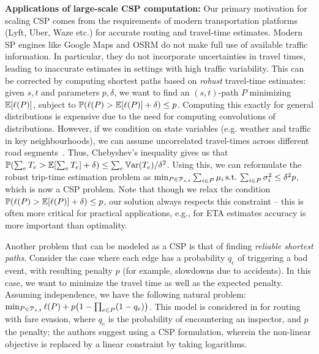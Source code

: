 \smallskip
\noindent\textbf{Applications of large-scale CSP computation:}
Our primary motivation for scaling CSP comes from the requirements of modern transportation platforms (Lyft, Uber, Waze etc.) for accurate routing and travel-time estimates.
Modern SP engines like Google Maps and OSRM do not make full use of available traffic information.
In particular, they do not incorporate uncertainties in travel times, leading to inaccurate estimates in settings with high traffic variability.
This can be corrected by computing shortest paths based on \emph{robust} travel-time estimates:
given $s,t$ and parameters $p,\delta$, we want to find an $(s,t)$-path $P$ minimizing $\mathbb{E}[\ell(P)]$, subject to $\mathbb{P}(\ell(P)>\mathbb{E}[\ell(P)]+\delta)\leq p$.
Computing this exactly for general distributions is expensive due to the need for computing convolutions of distributions. 
However, if we condition on state variables (e.g. weather and traffic in key neighbourhoods),  we can assume uncorrelated travel-times across different road segments~\cite{woodard2017predicting}. 
Thus, Chebyshev's inequality gives us that $\mathbb{P}(\sum_eT_e>\mathbb{E}[\sum_eT_e]+\delta)\leq \sum_e\mathbb{V}\textnormal{ar}(T_e)/\delta^2$. Using this, we can reformulate the robust trip-time estimation problem as 
$\min_{ P\in\mathcal{P}_{s,t}}\sum_{i\in P}\mu_i \, \mbox{s.t.}\, \sum_{i\in P}\sigma^2_i\leq \delta^2p$, which is now a CSP problem. 
Note that though we relax the condition $\mathbb{P}(\ell(P)>\mathbb{E}[\ell(P)]+\delta)\leq p$, our solution always respects this constraint -- this is often more critical for practical applications, e.g., for ETA estimates accuracy is more important than optimality.

Another problem that can be modeled as a CSP is that of finding \emph{reliable shortest paths}.
Consider the case where each edge has a probability $q_e$ of triggering a bad event, with resulting penalty $p$ (for example, slowdowns due to accidents).
In this case, we want to minimize the travel time as well as the expected penalty.
Assuming independence, we have the following natural problem:
$\min_{P\in\Pst} \ell(P)+p\prn*{1-\prod_{e\in P}(1-q_e)}$.
This model is considered in \cite{fareevasion} for routing with fare evasion, where $q_e$ is the probability of encountering an inspector, and $p$ the penalty; the authors suggest using a CSP formulation, wherein the non-linear objective is replaced by a linear constraint by taking logarithms.

